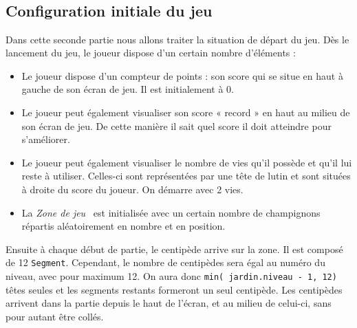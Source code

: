 \begin{typeag}[Ennemi]
        \\
        \\
		\\
        \\
\end{typeag}


\subsection{Configuration initiale du jeu}
Dans cette seconde partie nous allons traiter la situation de départ du jeu. Dès le lancement du jeu, le joueur dispose d'un certain nombre d'éléments : 

\begin{itemize}
	\item Le joueur dispose d'un compteur de points : son score qui se situe en haut à gauche de son écran de jeu. Il est initialement à 0.
	\item Le joueur peut également visualiser son score « record » en haut au milieu de son écran de jeu. De cette manière il sait quel score il doit atteindre pour s'améliorer.
	\item Le joueur peut également visualiser le nombre de vies qu'il possède et qu'il lui reste à utiliser. Celles-ci sont représentées par une tête de lutin et sont situées à droite du score du joueur. On démarre avec 2 vies.
	\item La  \emph{Zone de jeu}~ est initialisée avec un certain nombre de champignons répartis aléatoirement en nombre et en position.
\end{itemize}

Ensuite à chaque début de partie, le centipède arrive sur la zone. Il est composé de 12 \texttt{Segment}. Cependant, le nombre de centipèdes sera égal au numéro du niveau, avec pour maximum 12. On aura donc \texttt{min( jardin.niveau - 1, 12)} têtes seules et les segments restants formeront un seul centipède. Les centipèdes arrivent dans la partie depuis le haut de l'écran, et au milieu de celui-ci, sans pour autant être collés.
 
